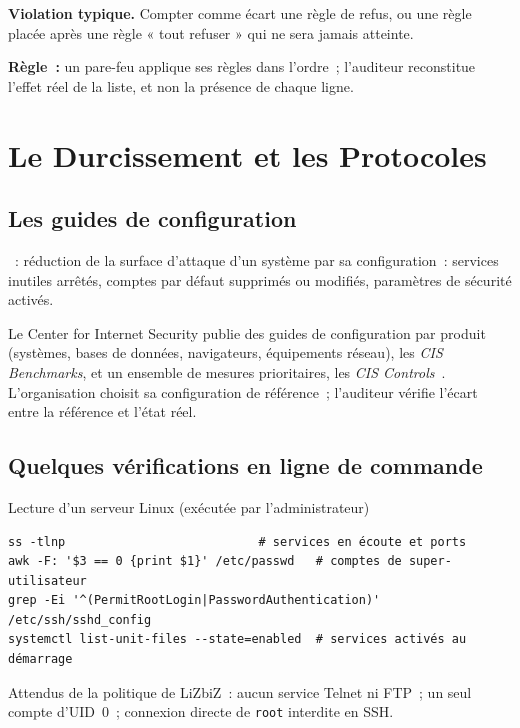 \begin{boxalert}
\textbf{Violation typique.} Compter comme écart une règle de refus, ou une
règle placée après une règle « tout refuser » qui ne sera jamais atteinte.

\smallskip
\textbf{Règle~:} un pare-feu applique ses règles dans l'ordre~; l'auditeur
reconstitue l'effet réel de la liste, et non la présence de chaque ligne.
\end{boxalert}

\section{Le Durcissement et les Protocoles}
\label{sec:c21-durcissement}

\subsection{Les guides de configuration}

\begin{boxdef}
~: réduction de la surface
d'attaque d'un système par sa configuration~: services inutiles arrêtés,
comptes par défaut supprimés ou modifiés, paramètres de sécurité activés.
\end{boxdef}

Le Center for Internet Security publie des guides de configuration par
produit (systèmes, bases de données, navigateurs, équipements réseau),
les \emph{CIS Benchmarks}, et un ensemble de mesures prioritaires, les
\emph{CIS Controls}~\cite{cis2021controls}. L'organisation choisit sa
configuration de référence~; l'auditeur vérifie l'écart entre la référence
et l'état réel.

\subsection{Quelques vérifications en ligne de commande}

\begin{boxoutils}{Lecture d'un serveur Linux (exécutée par l'administrateur)}
\begin{lstlisting}[language=bash_forensique]
ss -tlnp                           # services en écoute et ports
awk -F: '$3 == 0 {print $1}' /etc/passwd   # comptes de super-utilisateur
grep -Ei '^(PermitRootLogin|PasswordAuthentication)' /etc/ssh/sshd_config
systemctl list-unit-files --state=enabled  # services activés au démarrage
\end{lstlisting}
Attendus de la politique de LiZbiZ~: aucun service Telnet ni FTP~; un seul
compte d'UID~0~; connexion directe de \texttt{root} interdite en SSH.
\end{boxoutils}

